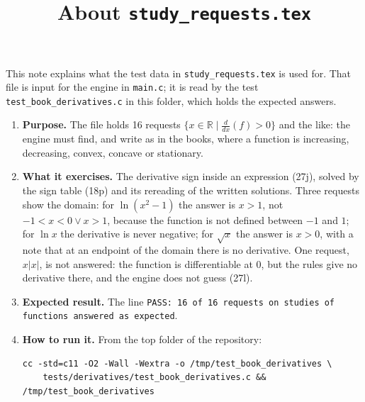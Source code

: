 \documentclass[11pt,a4paper]{article}
\title{About \texttt{study\_requests.tex}}
\author{}
\date{}
\begin{document}
\maketitle
This note explains what the test data in \texttt{study\_requests.tex} is used for. That file is input for the engine in \texttt{main.c}; it is read by the test \texttt{test\_book\_derivatives.c} in this folder, which holds the expected answers.

\begin{enumerate}
\item \textbf{Purpose.} The file holds 16 requests $\{x \in \mathbb{R} \mid \frac{d}{dx}\left( f \right) > 0\}$ and the like: the engine must find, and write as in the books, where a function is increasing, decreasing, convex, concave or stationary.

\item \textbf{What it exercises.} The derivative sign inside an expression (27j), solved by the sign table (18p) and its rereading of the written solutions. Three requests show the domain: for $\ln(x^{2} - 1)$ the answer is $x > 1$, not $-1 < x < 0 \lor x > 1$, because the function is not defined between $-1$ and $1$; for $\ln x$ the derivative is never negative; for $\sqrt{x}$ the answer is $x > 0$, with a note that at an endpoint of the domain there is no derivative. One request, $x|x|$, is not answered: the function is differentiable at $0$, but the rules give no derivative there, and the engine does not guess (27l).

\item \textbf{Expected result.} The line \texttt{PASS: 16 of 16 requests on studies of functions answered as expected}.

\item \textbf{How to run it.} From the top folder of the repository:
\begin{verbatim}
cc -std=c11 -O2 -Wall -Wextra -o /tmp/test_book_derivatives \
    tests/derivatives/test_book_derivatives.c && /tmp/test_book_derivatives
\end{verbatim}
\end{enumerate}
\end{document}
